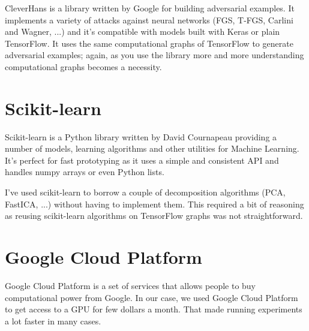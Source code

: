 CleverHans is a library written by Google for building
adversarial examples. It implements a variety of attacks
against neural networks (FGS, T-FGS, Carlini and Wagner,
...) and it's compatible with models built with Keras or
plain TensorFlow. It uses the same computational graphs of
TensorFlow to generate adversarial examples; again, as you
use the library more and more understanding computational
graphs becomes a necessity.

\section{Scikit-learn}
\label{sec:sklearn}

Scikit-learn is a Python library written by David Cournapeau
providing a number of models, learning algorithms and other
utilities for Machine Learning. It's perfect for fast
prototyping as it uses a simple and consistent API and
handles numpy arrays or even Python lists.

I've used scikit-learn to borrow a couple of decomposition
algorithms (PCA, FastICA, ...) without having to implement
them. This required a bit of reasoning as reusing
scikit-learn algorithms on TensorFlow graphs was not
straightforward.

\section{Google Cloud Platform}
\label{sec:google-cloud-platform}

Google Cloud Platform is a set of services that allows
people to buy computational power from Google. In our case,
we used Google Cloud Platform to get access to a GPU for few
dollars a month. That made running experiments a lot faster
in many cases.
